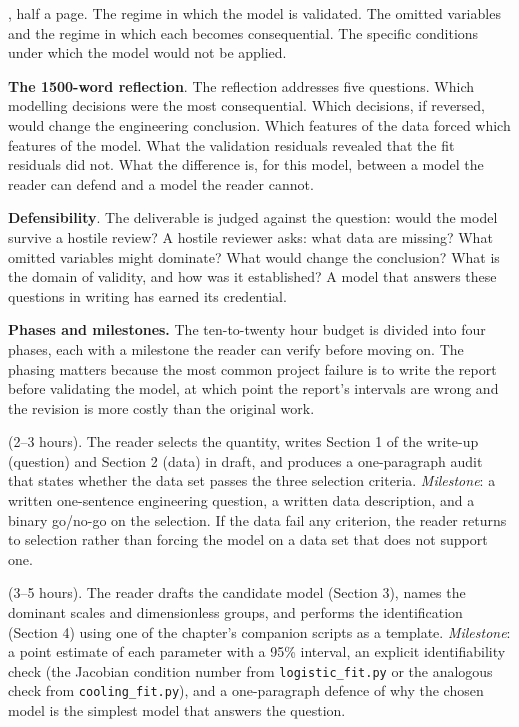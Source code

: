 \begin{project}
, half a page. The
regime in which the model is validated. The omitted variables
and the regime in which each becomes consequential. The
specific conditions under which the model would not be applied.

\smallskip
\textbf{The 1500-word reflection}. The reflection addresses five
questions. Which modelling decisions were the most consequential.
Which decisions, if reversed, would change the engineering
conclusion. Which features of the data forced which features of
the model. What the validation residuals revealed that the fit
residuals did not. What the difference is, for this model,
between a model the reader can defend and a model the reader
cannot.

\smallskip
\textbf{Defensibility}. The deliverable is judged against the
question: would the model survive a hostile review? A hostile
reviewer asks: what data are missing? What omitted variables
might dominate? What would change the conclusion? What is the
domain of validity, and how was it established? A model that
answers these questions in writing has earned its credential.

\smallskip
\textbf{Phases and milestones.} The ten-to-twenty hour budget is
divided into four phases, each with a milestone the reader can
verify before moving on. The phasing matters because the most
common project failure is to write the report before validating the
model, at which point the report's intervals are wrong and the
revision is more costly than the original work.

 (2--3 hours). The reader
selects the quantity, writes Section 1 of the write-up (question)
and Section 2 (data) in draft, and produces a one-paragraph audit
that states whether the data set passes the three selection
criteria. \textit{Milestone}: a written one-sentence engineering
question, a written data description, and a binary go/no-go on the
selection. If the data fail any criterion, the reader returns to
selection rather than forcing the model on a data set that does
not support one.

 (3--5 hours). The
reader drafts the candidate model (Section 3), names the dominant
scales and dimensionless groups, and performs the identification
(Section 4) using one of the chapter's companion scripts as a
template. \textit{Milestone}: a point estimate of each parameter
with a 95\% interval, an explicit identifiability check (the
Jacobian condition number from \texttt{logistic\_fit.py} or the
analogous check from \texttt{cooling\_fit.py}), and a one-paragraph
defence of why the chosen model is the simplest model that answers
the question.


\end{project}
